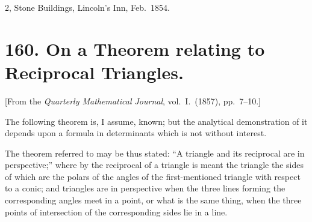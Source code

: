 \documentclass[12pt,a4paper]{article}
\theoremstyle{plain}
\begin{document}
\begin{flushright}
2, Stone Buildings, Lincoln's Inn, Feb.~1854.
\end{flushright}

\clearpage

\section*{160. On a Theorem relating to Reciprocal Triangles.}

[From the \textit{Quarterly Mathematical Journal}, vol.~I.\ (1857), pp.~7--10.]

The following theorem is, I assume, known; but the analytical demonstration of it depends upon a formula in determinants which is not without interest.

The theorem referred to may be thus stated: ``A triangle and its reciprocal are in perspective;'' where by the reciprocal of a triangle is meant the triangle the sides of which are the polars of the angles of the first-mentioned triangle with respect to a conic; and triangles are in perspective when the three lines forming the corresponding angles meet in a point, or what is the same thing, when the three points of intersection of the corresponding sides lie in a line.
\end{document}
